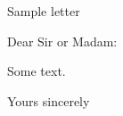 \documentclass{letter}
\begin{document}
\begin{letter}{Sample letter}

\opening{Dear Sir or Madam:}

Some text.

\closing{Yours sincerely \\
}
\end{letter}
\end{document}
